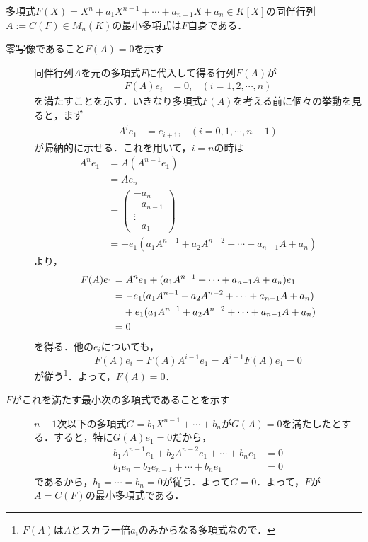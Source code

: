 \documentclass[uplatex, dvipdfmx]{jsreport}
\begin{document}
\begin{proposition}
    多項式$F(X) = X^n+a_1X^{n-1}+\cdots +a_{n-1}X+a_n \in K[X]$の同伴行列$A:=C(F)\in M_n(K)$の最小多項式は$F$自身である．
\end{proposition}
\begin{Proof}
    \begin{description}
        \item[零写像であること$F(A)=0$を示す] 
        同伴行列$A$を元の多項式$F$に代入して得る行列$F(A)$が
        \begin{align}
            F(A)e_i&=0,&(i=1,2,\cdots,n)
        \end{align}
        を満たすことを示す．いきなり多項式$F(A)$を考える前に個々の挙動を見ると，まず
        \begin{align*}
            A^ie_1&=e_{i+1},&(i=0,1,\cdots,n-1)
        \end{align*}
        が帰納的に示せる．これを用いて，$i=n$の時は
        \begin{align*}
            A^ne_1&=A(A^{n-1}e_1)\\
            &=Ae_n\\
            &=\begin{pmatrix}-a_n\\-a_{n-1}\\\vdots\\-a_1\end{pmatrix}\\
            &=-e_1(a_1A^{n-1}+a_2A^{n-2}+\cdots+a_{n-1}A+a_n)
        \end{align*}
        より，
        \begin{align*}
            F(A)e_1&=A^ne_1+(a_1A^{n-1}+\cdots+a_{n-1}A+a_n)e_1\\
            &=-e_1(a_1A^{n-1}+a_2A^{n-2}+\cdots+a_{n-1}A+a_n)\\
            &\hphantom{=}\;+e_1(a_1A^{n-1}+a_2A^{n-2}+\cdots+a_{n-1}A+a_n)\\
            &=0
        \end{align*}
        を得る．他の$e_i$についても，
        \[F(A)e_i=F(A)A^{i-1}e_1=A^{i-1}F(A)e_1=0\]
        が従う\footnote{$F(A)$は$A$とスカラー倍$a_i$のみからなる多項式なので．}．よって，$F(A)=0$．
        \item[$F$がこれを満たす最小次の多項式であることを示す] 
        $n-1$次以下の多項式$G=b_1X^{n-1}+\cdots+b_n$が$G(A)=0$を満たしたとする．すると，特に$G(A)e_1=0$だから，
        \begin{align*}
            b_1A^{n-1}e_1+b_2A^{n-2}e_1+\cdots+b_ne_1&=0\\
            b_1e_n+b_2e_{n-1}+\cdots+b_ne_1&=0
        \end{align*}
        であるから，$b_1=\cdots=b_n=0$が従う．よって$G=0$．よって，$F$が$A=C(F)$の最小多項式である．
    \end{description}
\end{Proof}
\end{document}
